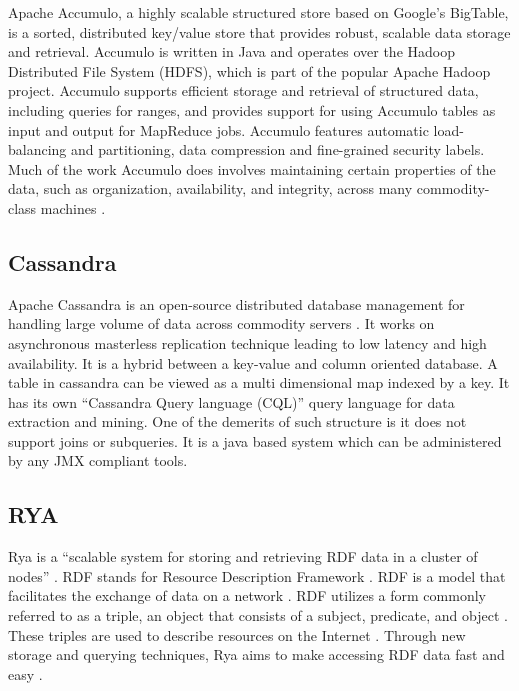 {     Apache Accumulo, a highly scalable structured store based on
     Google’s BigTable, is a sorted, distributed key/value store that
     provides robust, scalable data storage and retrieval. Accumulo is
     written in Java and operates over the Hadoop Distributed File
     System (HDFS), which is part of the popular Apache Hadoop
     project. Accumulo supports efficient storage and retrieval of
     structured data, including queries for ranges, and provides
     support for using Accumulo tables as input and output for
     MapReduce jobs.
     Accumulo features automatic load-balancing and
     partitioning, data compression and fine-grained security
     labels. Much of the work Accumulo does involves maintaining
     certain properties of the data, such as organization,
     availability, and integrity, across many commodity-class
     machines \cite{apache-accumulo}.

\subsection{Cassandra}

     Apache Cassandra is an open-source
     distributed database management for handling large volume of
     data across commodity servers \cite{www-cassandra}. It works on asynchronous
     masterless replication technique leading to low latency and high
     availability. It is a hybrid between a key-value and column
     oriented database. A table in cassandra can be viewed as a multi
     dimensional map indexed by a key. It has its own ``Cassandra Query
     language (CQL)'' query language for data extraction and
     mining. One of the demerits of such structure is it does not
     support joins or subqueries. It is a java based system which can
     be administered by any JMX compliant tools.

     \pv

\subsection{RYA}

     Rya is a ``scalable system for storing and retrieving RDF data in
     a cluster of nodes'' \cite{Punnoose}. RDF stands for Resource
     Description Framework \cite{Punnoose}. RDF is a model that
     facilitates the exchange of data on a network \cite{w3}. RDF
     utilizes a form commonly referred to as a triple, an object that
     consists of a subject, predicate, and object \cite{Punnoose}.
     These triples are used to describe resources on the
     Internet \cite{Punnoose}. Through new storage and querying
     techniques, Rya aims to make accessing RDF data fast and
     easy \cite{apacherya}.

}
